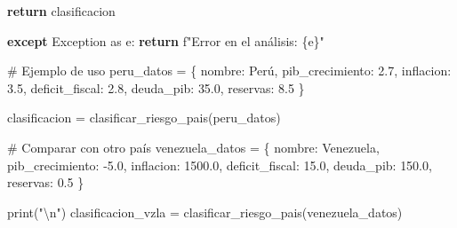 \documentclass[
  doc,
  floatsintext,
  longtable,
  a4paper,
  nolmodern,
  notxfonts,
  notimes,
  12pt,
  colorlinks=true,linkcolor=blue,citecolor=blue,urlcolor=blue]{apa7}
\newenvironment{Shaded}{\begin{snugshade}}{\end{snugshade}}
\newcommand{\BuiltInTok}[1]{\textcolor[rgb]{0.00,0.23,0.31}{#1}}
\newcommand{\CharTok}[1]{\textcolor[rgb]{0.13,0.47,0.30}{#1}}
\newcommand{\CommentTok}[1]{\textcolor[rgb]{0.37,0.37,0.37}{#1}}
\newcommand{\ControlFlowTok}[1]{\textcolor[rgb]{0.00,0.23,0.31}{\textbf{#1}}}
\newcommand{\FloatTok}[1]{\textcolor[rgb]{0.68,0.00,0.00}{#1}}
\newcommand{\ImportTok}[1]{\textcolor[rgb]{0.00,0.46,0.62}{#1}}
\newcommand{\NormalTok}[1]{\textcolor[rgb]{0.00,0.23,0.31}{#1}}
\newcommand{\OperatorTok}[1]{\textcolor[rgb]{0.37,0.37,0.37}{#1}}
\newcommand{\PreprocessorTok}[1]{\textcolor[rgb]{0.68,0.00,0.00}{#1}}
\newcommand{\SpecialCharTok}[1]{\textcolor[rgb]{0.37,0.37,0.37}{#1}}
\newcommand{\SpecialStringTok}[1]{\textcolor[rgb]{0.13,0.47,0.30}{#1}}
\newcommand{\StringTok}[1]{\textcolor[rgb]{0.13,0.47,0.30}{#1}}
\begin{document}
\begin{Shaded}
\begin{Highlighting}[]
        \ControlFlowTok{return}\NormalTok{ clasificacion}
        
    \ControlFlowTok{except} \PreprocessorTok{Exception} \ImportTok{as}\NormalTok{ e:}
        \ControlFlowTok{return} \SpecialStringTok{f"Error en el análisis: }\SpecialCharTok{\{}\NormalTok{e}\SpecialCharTok{\}}\SpecialStringTok{"}

\CommentTok{\# Ejemplo de uso}
\NormalTok{peru\_datos }\OperatorTok{=}\NormalTok{ \{}
    \StringTok{\textquotesingle{}nombre\textquotesingle{}}\NormalTok{: }\StringTok{\textquotesingle{}Perú\textquotesingle{}}\NormalTok{,}
    \StringTok{\textquotesingle{}pib\_crecimiento\textquotesingle{}}\NormalTok{: }\FloatTok{2.7}\NormalTok{,}
    \StringTok{\textquotesingle{}inflacion\textquotesingle{}}\NormalTok{: }\FloatTok{3.5}\NormalTok{,}
    \StringTok{\textquotesingle{}deficit\_fiscal\textquotesingle{}}\NormalTok{: }\FloatTok{2.8}\NormalTok{,}
    \StringTok{\textquotesingle{}deuda\_pib\textquotesingle{}}\NormalTok{: }\FloatTok{35.0}\NormalTok{,}
    \StringTok{\textquotesingle{}reservas\textquotesingle{}}\NormalTok{: }\FloatTok{8.5}
\NormalTok{\}}

\NormalTok{clasificacion }\OperatorTok{=}\NormalTok{ clasificar\_riesgo\_pais(peru\_datos)}

\CommentTok{\# Comparar con otro país}
\NormalTok{venezuela\_datos }\OperatorTok{=}\NormalTok{ \{}
    \StringTok{\textquotesingle{}nombre\textquotesingle{}}\NormalTok{: }\StringTok{\textquotesingle{}Venezuela\textquotesingle{}}\NormalTok{,}
    \StringTok{\textquotesingle{}pib\_crecimiento\textquotesingle{}}\NormalTok{: }\OperatorTok{{-}}\FloatTok{5.0}\NormalTok{,}
    \StringTok{\textquotesingle{}inflacion\textquotesingle{}}\NormalTok{: }\FloatTok{1500.0}\NormalTok{,}
    \StringTok{\textquotesingle{}deficit\_fiscal\textquotesingle{}}\NormalTok{: }\FloatTok{15.0}\NormalTok{,}
    \StringTok{\textquotesingle{}deuda\_pib\textquotesingle{}}\NormalTok{: }\FloatTok{150.0}\NormalTok{,}
    \StringTok{\textquotesingle{}reservas\textquotesingle{}}\NormalTok{: }\FloatTok{0.5}
\NormalTok{\}}

\BuiltInTok{print}\NormalTok{(}\StringTok{"}\CharTok{\textbackslash{}n}\StringTok{"}\NormalTok{)}
\NormalTok{clasificacion\_vzla }\OperatorTok{=}\NormalTok{ clasificar\_riesgo\_pais(venezuela\_datos)}
\end{Highlighting}
\end{Shaded}
\end{document}
